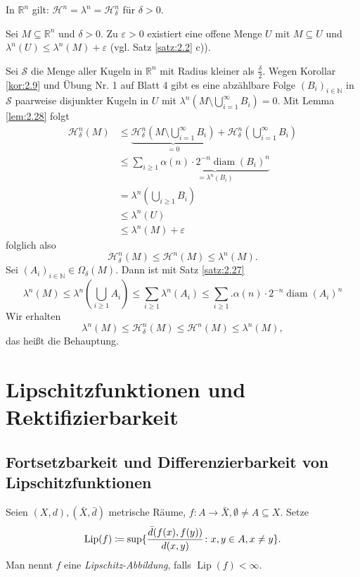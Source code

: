 \documentclass[a4paper,twoside,DIV15,BCOR12mm]{scrbook}
\newcommand{\HM}{\mathscr H}
\DeclareMathOperator{\diam}{diam}
\DeclareMathOperator{\Lip}{Lip}
\begin{document}
\begin{satz}
In \(\mathbb R^n\) gilt: \(\HM^n = \lambda^n = \HM^n_\delta\) für \(\delta > 0\).
\end{satz}
\begin{beweis}
Sei \(M \subseteq \mathbb R^n\) und $\delta>0$. Zu \(\varepsilon > 0\) existiert eine offene Menge \(U\) mit \(M \subseteq U\) und \(\lambda^n(U) \leq \lambda^n(M) + \varepsilon\) (vgl. Satz \ref{satz:2.2} c)).
\par
Sei \(\mathcal S\) die Menge aller Kugeln in \(\mathbb R^n\) mit Radius kleiner als \(\frac{\delta}2\). Wegen Korollar \ref{kor:2.9} und Übung Nr. 1 auf Blatt 4 gibt es eine abzählbare Folge \((B_i)_{i\in\mathbb N}\) in \(\mathcal S\) paarweise disjunkter Kugeln in \(U\) mit \(\lambda^n(M \setminus \bigcup_{i=1}^\infty B_i) = 0\). Mit Lemma \ref{lem:2.28} folgt
\begin{align*}
\HM^n_\delta(M) &\leq \underbrace{\HM^n_\delta(M\setminus \bigcup_{i=1}^\infty B_i)}_{=0} + \HM^n_\delta(\bigcup_{i=1}^\infty B_i) \\
&\leq \sum_{i\geq1} \underbrace{ \alpha(n) \cdot 2^{-n} \diam(B_i)^n }_{= \lambda^n(B_i)} \\
&= \lambda^n(\bigcup_{i\geq1} B_i) \\
&\leq \lambda^n(U) \\
&\leq \lambda^n(M) + \varepsilon
\end{align*}
folglich also
\[
\HM^n_\delta(M) \leq \HM^n(M) \leq \lambda^n(M).
\]
Sei \((A_i)_{i\in\mathbb N} \in \Omega_\delta(M)\). Dann ist mit Satz \ref{satz:2.27}
\[
\lambda^n(M) \leq \lambda^n(\bigcup_{i\geq1} A_i) \leq \sum_{i\geq1} \lambda^n(A_i) \leq \sum_{i\geq1}. \alpha(n)\cdot 2^{-n} \diam(A_i)^n
\]
Wir erhalten
\[
\lambda^n(M) \leq \HM^n_\delta(M) \leq \HM^n(M) \leq \lambda^n(M),
\]
das heißt die Behauptung.
\end{beweis}

\chapter{Lipschitzfunktionen und Rektifizierbarkeit}

\section{Fortsetzbarkeit und Differenzierbarkeit von Lipschitzfunktionen}

\begin{definition}
Seien \((X,d), (\bar X,\bar d)\) metrische Räume, \(f: A\rightarrow \bar X, \emptyset \neq A \subseteq X\). 
Setze
\[
\Lip(f) \da \sup \{ \frac{\bar d(f(x),f(y))}{d(x,y)} \colon x,y \in A, x\neq y\}.
\]
Man nennt \(f\) eine \emph{Lipschitz-Abbildung}, falls \(\Lip(f) < \infty\).
\end{definition}
\end{document}
